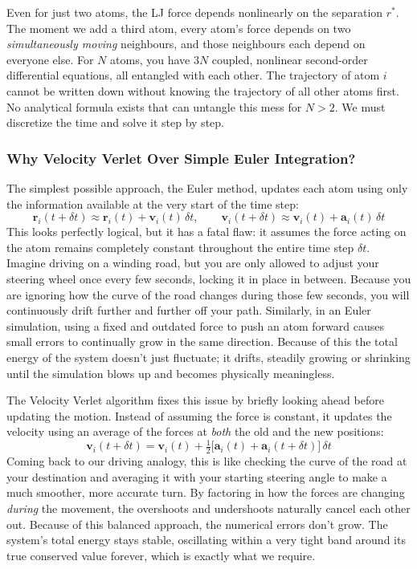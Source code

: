 Even for just two atoms, the LJ force depends nonlinearly on the separation $r^*$. The moment we add a third atom, every atom's force depends on two \emph{simultaneously moving} neighbours, and those neighbours each depend on everyone else. For $N$ atoms, you have $3N$ coupled, nonlinear second-order differential equations, all entangled with each other. The trajectory of atom $i$ cannot be written down without knowing the trajectory of all other atoms first. No analytical formula exists that can untangle this mess for $N > 2$. We must discretize the time and solve it step by step.

\subsubsection{Why Velocity Verlet Over Simple Euler Integration?}

The simplest possible approach, the Euler method, updates each atom using only the information available at the very start of the time step:
$$\mathbf{r}_i(t+\delta t) \approx \mathbf{r}_i(t) + \mathbf{v}_i(t)\,\delta t, \qquad \mathbf{v}_i(t+\delta t) \approx \mathbf{v}_i(t) + \mathbf{a}_i(t)\,\delta t$$
This looks perfectly logical, but it has a fatal flaw: it assumes the force acting on the atom remains completely constant throughout the entire time step $\delta t$. Imagine driving on a winding road, but you are only allowed to adjust your steering wheel once every few seconds, locking it in place in between. Because you are ignoring how the curve of the road changes during those few seconds, you will continuously drift further and further off your path. Similarly, in an Euler simulation, using a fixed and outdated force to push an atom forward causes small errors to continually grow in the same direction. Because of this the total energy of the system doesn't just fluctuate; it drifts, steadily growing or shrinking until the simulation blows up and becomes physically meaningless.

The Velocity Verlet algorithm fixes this issue by briefly looking ahead before updating the motion. Instead of assuming the force is constant, it updates the velocity using an average of the forces at \emph{both} the old and the new positions:
$$\mathbf{v}_i(t+\delta t) = \mathbf{v}_i(t) + \tfrac{1}{2}\bigl[\mathbf{a}_i(t) + \mathbf{a}_i(t+\delta t)\bigr]\,\delta t$$
Coming back to our driving analogy, this is like checking the curve of the road at your destination and averaging it with your starting steering angle to make a much smoother, more accurate turn. By factoring in how the forces are changing \emph{during} the movement, the overshoots and undershoots naturally cancel each other out. Because of this balanced approach, the numerical errors don't grow. The system's total energy stays stable, oscillating within a very tight band around its true conserved value forever, which is exactly what we require.


